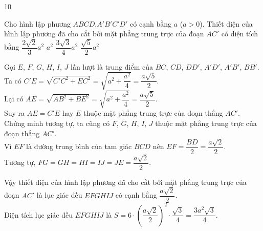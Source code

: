 \begin{indapan}{10}
\begin{ex}%
Cho hình lập phương $ABCD.A'B'C'D'$ có cạnh bằng $a$ ($a>0$). Thiết diện của hình lập phương đã cho cắt bởi mặt phẳng trung trực của đoạn $AC'$ có diện tích bằng
\choice
{$\dfrac{2\sqrt{2}}{3}a^2$}
{$a^2$}
{\True $\dfrac{3\sqrt{3}}{4}a^2$}
{$\dfrac{\sqrt{5}}{2}a^2$}
\loigiai
{
\immini
{
Gọi $E$, $F$, $G$, $H$, $I$, $J$ lần lượt là trung điểm của $BC$, $CD$, $DD'$, $A'D'$, $A'B'$, $BB'$.\\
Ta có $C'E=\sqrt{C'C^2+EC^2} = \sqrt{a^2+\dfrac{a^2}{4}} = \dfrac{a\sqrt{5}}{2}$.\\
Lại có $AE=\sqrt{AB^2+BE^2} = \sqrt{a^2+\dfrac{a^2}{4}} = \dfrac{a\sqrt{5}}{2}$.\\
Suy ra $AE=C'E$ hay $E$ thuộc mặt phẳng trung trực của đoạn thẳng $AC'$.\\
Chứng minh tương tự, ta cũng có $F$, $G$, $H$, $I$, $J$ thuộc mặt phẳng trung trực của đoạn thẳng $AC'$.\\
Vì $EF$ là đường trung bình của tam giác $BCD$ nên $EF=\dfrac{BD}{2}=\dfrac{a\sqrt{2}}{2}$.\\
Tương tự, $FG=GH=HI=IJ=JE=\dfrac{a\sqrt{2}}{2}$.
}
{
}
\noindent
Vậy thiết diện của hình lập phương đã cho cắt bởi mặt phẳng trung trực của đoạn $AC'$ là lục giác đều $EFGHIJ$ có cạnh bằng $\dfrac{a\sqrt{2}}{2}$.\\
Diện tích lục giác đều $EFGHIJ$ là $S=6\cdot \left(\dfrac{a\sqrt{2}}{2}\right)^2\cdot \dfrac{\sqrt{3}}{4} = \dfrac{3a^2\sqrt{3}}{4}$.
}
\end{ex}


\end{indapan}
